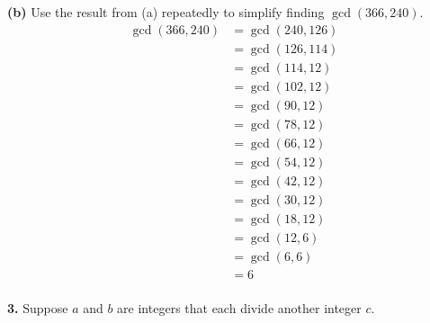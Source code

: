 \documentclass[12pt, letterpaper]{article}
\begin{document}
\textbf{(b)} Use the result from (a) repeatedly to simplify finding $\gcd(366, 240)$.
\begin{align*}
    \gcd(366, 240) &= \gcd(240, 126) \\
    &= \gcd(126, 114) \\
    &= \gcd(114, 12) \\
    &= \gcd(102, 12) \\
    &= \gcd(90, 12) \\
    &= \gcd(78, 12)\\
    &= \gcd(66, 12) \\
    &= \gcd(54, 12) \\
    &= \gcd(42, 12) \\
    &= \gcd(30, 12) \\
    &= \gcd(18, 12) \\
    &= \gcd(12, 6) \\
    &= \gcd(6, 6) \\
    &= \boxed{6}
\end{align*} \\



\noindent\textbf{3.} Suppose $a$ and $b$ are integers that each divide another integer $c$. 
\end{document}
